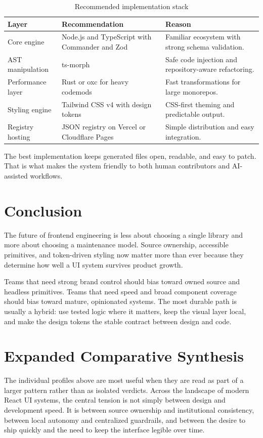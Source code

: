 \documentclass[11pt,twoside,a4paper]{article}
\begin{document}
\begin{table}[htbp]
  \centering
  \caption{Recommended implementation stack}
  \begin{tabularx}{\textwidth}{@{}p{}p{}Y@{}}
    \toprule
    \textbf{Layer} & \textbf{Recommendation} & \textbf{Reason} \\
    \midrule
    Core engine & Node.js and TypeScript with Commander and Zod & Familiar ecosystem with strong schema validation. \\
    AST manipulation & ts-morph & Safe code injection and repository-aware refactoring. \\
    Performance layer & Rust or oxc for heavy codemods & Fast transformations for large monorepos. \\
    Styling engine & Tailwind CSS v4 with design tokens & CSS-first theming and predictable output. \\
    Registry hosting & JSON registry on Vercel or Cloudflare Pages & Simple distribution and easy integration. \\
    \bottomrule
  \end{tabularx}
\end{table}

The best implementation keeps generated files open, readable, and easy to patch. That is what makes the system friendly to both human contributors and AI-assisted workflows.

\section{Conclusion}
The future of frontend engineering is less about choosing a single library and more about choosing a maintenance model. Source ownership, accessible primitives, and token-driven styling now matter more than ever because they determine how well a UI system survives product growth.

Teams that need strong brand control should bias toward owned source and headless primitives. Teams that need speed and broad component coverage should bias toward mature, opinionated systems. The most durable path is usually a hybrid: use tested logic where it matters, keep the visual layer local, and make the design tokens the stable contract between design and code.

\clearpage
\section{Expanded Comparative Synthesis}
The individual profiles above are most useful when they are read as part of a larger pattern rather than as isolated verdicts. Across the landscape of modern React UI systems, the central tension is not simply between design and development speed. It is between source ownership and institutional consistency, between local autonomy and centralized guardrails, and between the desire to ship quickly and the need to keep the interface legible over time.
\end{document}
